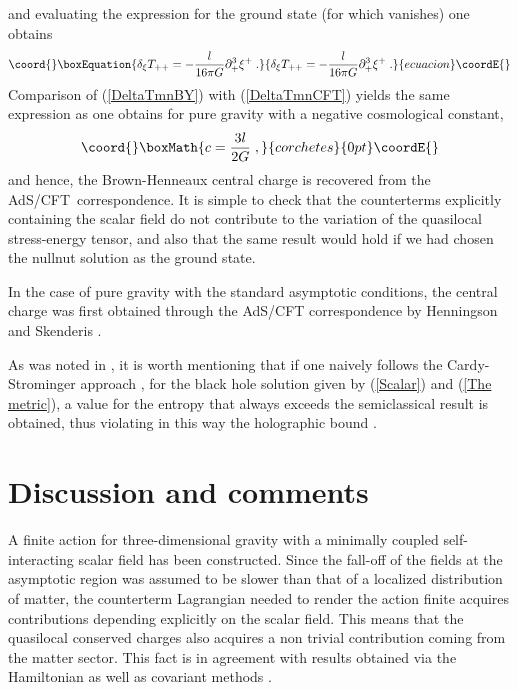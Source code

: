 \documentclass[a4paper,12pt]{article}
\begin{document}
and evaluating the expression for the ground state (for which \coordHE{}
vanishes) one obtains 
\begin{equation}\coord{}\boxEquation{
\delta _{\xi }T_{++}=-\frac{l}{16\pi G}\partial _{+}^{3}\xi ^{+}\;.
\label{DeltaTmnBY}
}{
\delta _{\xi }T_{++}=-\frac{l}{16\pi G}\partial _{+}^{3}\xi ^{+}\;.
}{ecuacion}\coordE{}\end{equation}
Comparison of (\ref{DeltaTmnBY}) with (\ref{DeltaTmnCFT}) yields the same
expression as one obtains for pure gravity with a negative cosmological constant, 
\[\coord{}\boxMath{
c=\frac{3l}{2G}\;, 
}{corchetes}{0pt}\coordE{}\]
and hence, the Brown-Henneaux central charge is recovered from the AdS/CFT\
correspondence. It is simple to check that the counterterms explicitly containing
the scalar field do not contribute to the variation of the
quasilocal stress-energy tensor, and also that the same result would hold
if we had chosen the nullnut solution as the ground state.

In the case of pure gravity with the standard asymptotic conditions, the 
central charge was first obtained through the AdS/CFT correspondence by
Henningson and Skenderis \cite{Henningson:1998gx}.

As was noted in \cite{HMTZ}, it is worth mentioning that if one naively
follows the Cardy-Strominger approach \cite{Strominger:1997eq}, for the
black hole solution given by (\ref{Scalar}) and (\ref{The metric}), a value
for the entropy that always exceeds the semiclassical result is obtained,
thus violating in this way the holographic bound \cite{'tHooft:gx,Susskind:1994vu}.

\section{Discussion and comments}

A finite action for three-dimensional gravity with a minimally coupled
self-interacting scalar field has been constructed. Since the fall-off of
the fields at the asymptotic region was assumed to be slower than that of a
localized distribution of matter, the counterterm Lagrangian needed to
render the action finite acquires contributions depending explicitly on the
scalar field. This means that the quasilocal conserved charges also acquires
a non trivial contribution coming from the matter sector. This fact is in
agreement with results obtained via the Hamiltonian \cite{HMTZ} as well
as covariant methods \cite{Barnich:2002pi}.
\end{document}
